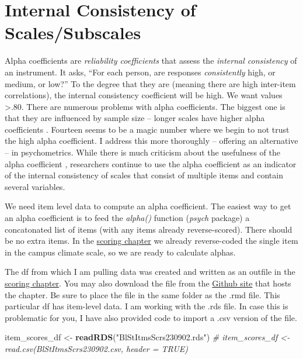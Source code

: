 \documentclass[
  11pt,
]{book}
\newenvironment{Shaded}{\begin{snugshade}}{\end{snugshade}}
\newcommand{\CommentTok}[1]{\textcolor[rgb]{0.37,0.37,0.37}{\textit{#1}}}
\newcommand{\FunctionTok}[1]{\textcolor[rgb]{0.27,0.27,0.27}{\textbf{#1}}}
\newcommand{\NormalTok}[1]{#1}
\newcommand{\OtherTok}[1]{\textcolor[rgb]{0.37,0.37,0.37}{#1}}
\newcommand{\StringTok}[1]{\textcolor[rgb]{0.5,0.5,0.5}{#1}}
\begin{document}
\hypertarget{internal-consistency-of-scalessubscales}{%
\section{Internal Consistency of Scales/Subscales}\label{internal-consistency-of-scalessubscales}}

Alpha coefficients are \emph{reliability coefficients} that assess the \emph{internal consistency} of an instrument. It asks, ``For each person, are responses \emph{consistently} high, or medium, or low?'' To the degree that they are (meaning there are high inter-item correlations), the internal consistency coefficient will be high. We want values \textgreater.80. There are numerous problems with alpha coefficients. The biggest one is that they are influenced by sample size -- longer scales have higher alpha coefficients \citep{cortina_what_1993}. Fourteen seems to be a magic number where we begin to not trust the high alpha coefficient. I address this more thoroughly -- offering an alternative -- in psychometrics. While there is much criticism about the usefulness of the alpha coefficient \citep{sijtsma_use_2009}, researchers continue to use the alpha coefficient as an indicator of the internal consistency of scales that consist of multiple items and contain several variables.

We need item level data to compute an alpha coefficient. The easiest way to get an alpha coefficient is to feed the \emph{alpha()} function (\emph{psych} package) a concatonated list of items (with any items already reverse-scored). There should be no extra items. In the \protect\hyperlink{score}{scoring chapter} we already reverse-coded the single item in the campus climate scale, so we are ready to calculate alphas.

The df from which I am pulling data was created and written as an outfile in the \protect\hyperlink{score}{scoring chapter}. You may also download the file from the \href{https://github.com/lhbikos/ReC_MultivModel}{Github site} that hosts the chapter. Be sure to place the file in the same folder as the .rmd file. This particular df has item-level data. I am working with the .rds file. In case this is problematic for you, I have also provided code to import a .csv version of the file.

\begin{Shaded}
\begin{Highlighting}[]
\NormalTok{item\_scores\_df }\OtherTok{\textless{}{-}} \FunctionTok{readRDS}\NormalTok{(}\StringTok{"BlStItmsScrs230902.rds"}\NormalTok{)}
\CommentTok{\# item\_scores\_df \textless{}{-} read.csv(\textquotesingle{}BlStItmsScrs230902.csv\textquotesingle{}, header = TRUE)}
\end{Highlighting}
\end{Shaded}
\end{document}
